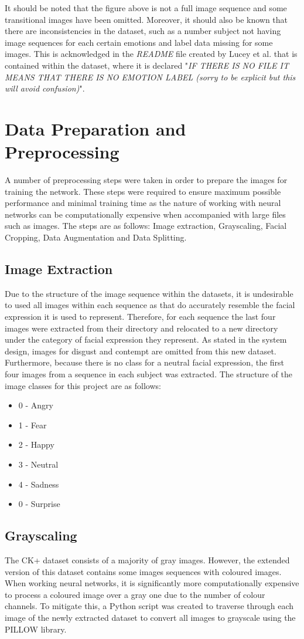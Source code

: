 It should be noted that the figure above is not a full image sequence and some transitional images have been omitted. Moreover, it should also be known that there are inconsistencies in the dataset, such as a number subject not having image sequences for each certain emotions and label data missing for some images. This is acknowledged in the \textit{README} file created by Lucey et al. that is contained within the dataset, where it is declared "\textit{IF THERE IS NO FILE IT MEANS THAT THERE IS NO EMOTION LABEL (sorry to be explicit but this will avoid confusion)}". 
\section{Data Preparation and Preprocessing}
A number of preprocessing steps were taken in order to prepare the images for training the network. These steps were required to ensure maximum possible performance and minimal training time as the nature of working with neural networks can be computationally expensive when accompanied with large files such as images. The steps are as follows: Image extraction, Grayscaling, Facial Cropping, Data Augmentation and Data Splitting. 
\subsection{Image Extraction}
Due to the structure of the image sequence within the datasets, it is undesirable to used all images within each sequence as that do accurately resemble the facial expression it is used to represent. Therefore, for each sequence the last four images were extracted from their directory and relocated to a new directory under the category of facial expression they represent. As stated in the system design, images for disgust and contempt are omitted from this new dataset. Furthermore, because there is no class for a neutral facial expression, the first four images from a sequence in each subject was extracted.
The structure of the image classes for this project are as follows:
\begin{itemize}
	\item 0 - Angry
	\item 1 - Fear
	\item 2 - Happy
	\item 3 - Neutral
	\item 4 - Sadness
	\item 0 - Surprise	
\end{itemize}


\subsection{Grayscaling}
The CK+ dataset consists of a majority of gray images. However, the extended version of this dataset contains some images sequences with coloured images. When working neural networks, it is significantly more computationally expensive to process a coloured image over a gray one due to the number of colour channels. To mitigate this, a Python script was created to traverse through each image of the newly extracted dataset to convert all images to grayscale using the PILLOW library. \\

